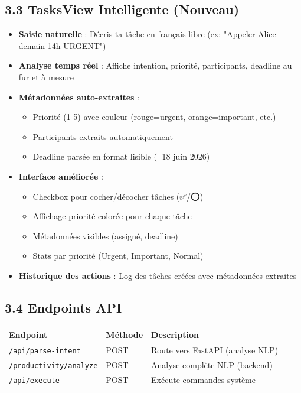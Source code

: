 \documentclass[12pt,french]{article}
\begin{document}
\subsection*{3.3 TasksView Intelligente (Nouveau)}
\begin{itemize}
    \item \textbf{Saisie naturelle} : Décris ta tâche en français libre (ex: "Appeler Alice demain 14h URGENT")
    \item \textbf{Analyse temps réel} : Affiche intention, priorité, participants, deadline au fur et à mesure
    \item \textbf{Métadonnées auto-extraites} :
    \begin{itemize}
        \item Priorité (1-5) avec couleur (rouge=urgent, orange=important, etc.)
        \item Participants extraits automatiquement
        \item Deadline parsée en format lisible (📅 18 juin 2026)
    \end{itemize}
    \item \textbf{Interface améliorée} :
    \begin{itemize}
        \item Checkbox pour cocher/décocher tâches (✅/⭕)
        \item Affichage priorité colorée pour chaque tâche
        \item Métadonnées visibles (assigné, deadline)
        \item Stats par priorité (Urgent, Important, Normal)
    \end{itemize}
    \item \textbf{Historique des actions} : Log des tâches créées avec métadonnées extraites
\end{itemize}

\subsection*{3.4 Endpoints API}
\begin{table}[h!]
\centering
\begin{tabular}{lll}
\toprule
\textbf{Endpoint} & \textbf{Méthode} & \textbf{Description} \\
\midrule
\texttt{/api/parse-intent} & POST & Route vers FastAPI (analyse NLP) \\
\texttt{/productivity/analyze} & POST & Analyse complète NLP (backend) \\
\texttt{/api/execute} & POST & Exécute commandes système \\
\bottomrule
\end{tabular}
\end{table}
\end{document}
